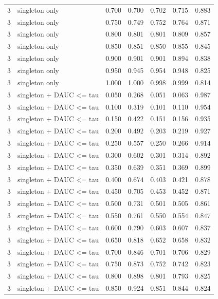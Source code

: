 \begin{tabular}{rlrrrrr}
3 & singleton only & 0.700 & 0.700 & 0.702 & 0.715 & 0.883 \\
3 & singleton only & 0.750 & 0.749 & 0.752 & 0.764 & 0.871 \\
3 & singleton only & 0.800 & 0.801 & 0.801 & 0.809 & 0.857 \\
3 & singleton only & 0.850 & 0.851 & 0.850 & 0.855 & 0.845 \\
3 & singleton only & 0.900 & 0.901 & 0.901 & 0.894 & 0.838 \\
3 & singleton only & 0.950 & 0.945 & 0.954 & 0.948 & 0.825 \\
3 & singleton only & 1.000 & 1.000 & 0.998 & 0.999 & 0.814 \\
3 & singleton + DAUC <= tau & 0.050 & 0.268 & 0.051 & 0.063 & 0.987 \\
3 & singleton + DAUC <= tau & 0.100 & 0.319 & 0.101 & 0.110 & 0.954 \\
3 & singleton + DAUC <= tau & 0.150 & 0.422 & 0.151 & 0.156 & 0.935 \\
3 & singleton + DAUC <= tau & 0.200 & 0.492 & 0.203 & 0.219 & 0.927 \\
3 & singleton + DAUC <= tau & 0.250 & 0.557 & 0.250 & 0.266 & 0.914 \\
3 & singleton + DAUC <= tau & 0.300 & 0.602 & 0.301 & 0.314 & 0.892 \\
3 & singleton + DAUC <= tau & 0.350 & 0.639 & 0.351 & 0.369 & 0.899 \\
3 & singleton + DAUC <= tau & 0.400 & 0.674 & 0.403 & 0.421 & 0.878 \\
3 & singleton + DAUC <= tau & 0.450 & 0.705 & 0.453 & 0.452 & 0.871 \\
3 & singleton + DAUC <= tau & 0.500 & 0.731 & 0.501 & 0.505 & 0.861 \\
3 & singleton + DAUC <= tau & 0.550 & 0.761 & 0.550 & 0.554 & 0.847 \\
3 & singleton + DAUC <= tau & 0.600 & 0.790 & 0.603 & 0.607 & 0.837 \\
3 & singleton + DAUC <= tau & 0.650 & 0.818 & 0.652 & 0.658 & 0.832 \\
3 & singleton + DAUC <= tau & 0.700 & 0.846 & 0.701 & 0.706 & 0.829 \\
3 & singleton + DAUC <= tau & 0.750 & 0.873 & 0.752 & 0.742 & 0.823 \\
3 & singleton + DAUC <= tau & 0.800 & 0.898 & 0.801 & 0.793 & 0.825 \\
3 & singleton + DAUC <= tau & 0.850 & 0.924 & 0.851 & 0.844 & 0.824 \\

\end{tabular}
